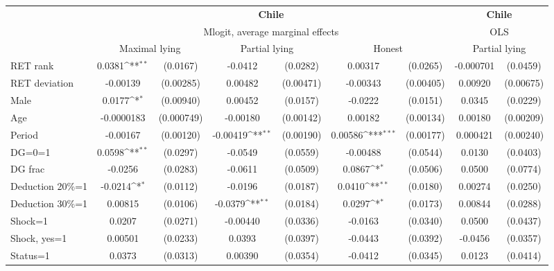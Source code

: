 \def\sym#1{\ifmmode^{#1}\else\(^{#1}\)\fi}
\begin{tabular}{l|cccccc|cc}
\hline\hline
&\multicolumn{6}{c|}{\bf Chile}&\multicolumn{2}{c}{\bf Chile}\\ &\multicolumn{6}{c|}{Mlogit, average marginal effects }&\multicolumn{2}{c}{OLS}\\
                &\multicolumn{2}{c}{Maximal lying}&\multicolumn{2}{c}{Partial lying}&\multicolumn{2}{c}{Honest}  &\multicolumn{2}{c}{Partial lying}\\
\hline
RET rank        &   0.0381\sym{**} & (0.0167)&  -0.0412         & (0.0282)&  0.00317         & (0.0265)&-0.000701         & (0.0459)\\
RET deviation   & -0.00139         &(0.00285)&  0.00482         &(0.00471)& -0.00343         &(0.00405)&  0.00920         &(0.00675)\\
Male            &   0.0177\sym{*}  &(0.00940)&  0.00452         & (0.0157)&  -0.0222         & (0.0151)&   0.0345         & (0.0229)\\
Age             &-0.0000183         &(0.000749)& -0.00180         &(0.00142)&  0.00182         &(0.00134)&  0.00180         &(0.00209)\\
Period          & -0.00167         &(0.00120)& -0.00419\sym{**} &(0.00190)&  0.00586\sym{***}&(0.00177)& 0.000421         &(0.00240)\\
DG=0=1          &   0.0598\sym{**} & (0.0297)&  -0.0549         & (0.0559)& -0.00488         & (0.0544)&   0.0130         & (0.0403)\\
DG frac         &  -0.0256         & (0.0283)&  -0.0611         & (0.0509)&   0.0867\sym{*}  & (0.0506)&   0.0500         & (0.0774)\\
Deduction 20\%=1&  -0.0214\sym{*}  & (0.0112)&  -0.0196         & (0.0187)&   0.0410\sym{**} & (0.0180)&  0.00274         & (0.0250)\\
Deduction 30\%=1&  0.00815         & (0.0106)&  -0.0379\sym{**} & (0.0184)&   0.0297\sym{*}  & (0.0173)&  0.00844         & (0.0288)\\
Shock=1         &   0.0207         & (0.0271)& -0.00440         & (0.0336)&  -0.0163         & (0.0340)&   0.0500         & (0.0437)\\
Shock, yes=1    &  0.00501         & (0.0233)&   0.0393         & (0.0397)&  -0.0443         & (0.0392)&  -0.0456         & (0.0357)\\
Status=1        &   0.0373         & (0.0313)&  0.00390         & (0.0354)&  -0.0412         & (0.0345)&   0.0123         & (0.0414)\\

\end{tabular}
